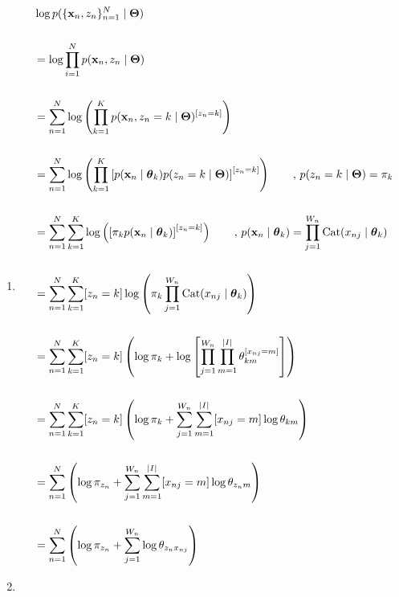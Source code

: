 



 \begin{enumerate}
   \item 
   
    \begin{align*}
        &\log p(\{\bold{x}_n, z_n\}_{n=1}^N \mid \bold{\Theta}) \\
        & \\
        &= \log \prod_{i=1}^N p(\bold{x}_n, z_n \mid \bold{\Theta}) \\
        & \\
        &= \sum_{n=1}^N \log \left( \prod_{k=1}^K p(\bold{x}_n, z_n=k \mid \bold{\Theta})^{[z_n=k]}\right) \\
        & \\
        &= \sum_{n=1}^N \log \left( \prod_{k=1}^K \left[p(\bold{x}_n \mid \boldsymbol{\theta}_k) p(z_n=k \mid \bold{\Theta})\right]^{[z_n=k]}\right) \qquad \text{, }p(z_n=k \mid \bold{\Theta}) = \pi_k\\
        & \\
        &= \sum_{n=1}^N \sum_{k=1}^K \log \left( \left[ \pi_k p(\bold{x}_n \mid \boldsymbol{\theta}_k) \right]^{[z_n = k]} \right) \qquad\text{, }p(\bold{x}_n \mid \boldsymbol{\theta}_k) = \prod_{j=1}^{W_n} \operatorname{Cat}(x_{nj} \mid \boldsymbol{\theta}_k)\\\
        & \\
        &= \sum_{n=1}^N \sum_{k=1}^K [z_n = k] \log\left( \pi_k \prod_{j=1}^{W_n} \operatorname{Cat}(x_{nj} \mid \boldsymbol{\theta}_k)\right) \\
        & \\
        &= \sum_{n=1}^N \sum_{k=1}^K [z_n = k] \left( \log \pi_k + \log \left[\prod_{j=1}^{W_n} \prod_{m=1}^{\vert I \vert} \theta_{km}^{[x_{nj} = m]}\right]\right) \\
        & \\
        &= \sum_{n=1}^N \sum_{k=1}^K [z_n = k] \left( \log \pi_k + \sum_{j=1}^{W_n} \sum_{m=1}^{\vert I\vert}[x_{nj} = m] \log \theta_{km}\right) \\
        & \\
        &= \sum_{n=1}^N \left( \log \pi_{z_n} + \sum_{j=1}^{W_n} \sum_{m=1}^{\vert I\vert}[x_{nj} = m] \log \theta_{z_n m}\right) \\
        & \\
        &= \sum_{n=1}^N \left( \log \pi_{z_n} + \sum_{j=1}^{W_n} \log \theta_{z_n x_{nj}}\right)
    \end{align*}
   \newpage
   \item 
   

\end{enumerate}
